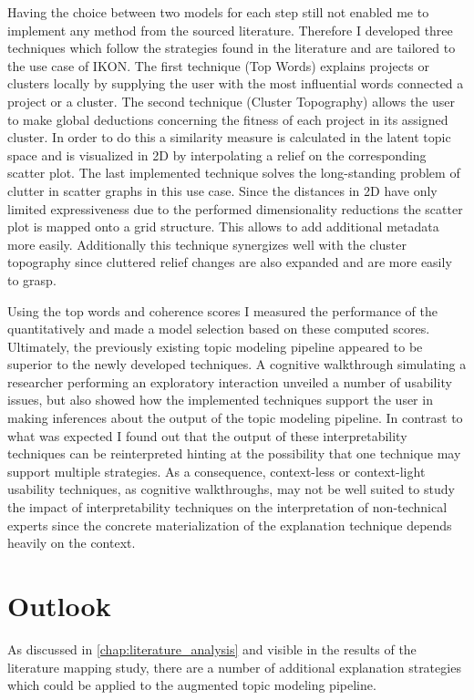 Having the choice between two models for each step still not enabled me to implement any method from the sourced literature. Therefore I developed three techniques which follow the strategies found in the literature and are tailored to the use case of IKON. 
The first technique (Top Words) explains projects or clusters locally by supplying the user with the most influential words connected a project or a cluster.
The second technique (Cluster Topography) allows the user to make global deductions concerning the fitness of each project in its assigned cluster. In order to do this a similarity measure is calculated in the latent topic space and is visualized in 2D by interpolating a relief on the corresponding scatter plot.
The last implemented technique solves the long-standing problem of clutter in scatter graphs in this use case. Since the distances in 2D have only limited expressiveness due to the performed dimensionality reductions the scatter plot is mapped onto a grid structure. This allows to add additional metadata more easily. Additionally this technique synergizes well with the cluster topography since cluttered relief changes are also expanded and are more easily to grasp.

Using the top words and coherence scores I measured the performance of the  quantitatively and made a model selection based on these computed scores. Ultimately, the previously existing topic modeling pipeline appeared to be superior to the newly developed techniques.
A cognitive walkthrough simulating a researcher performing an exploratory interaction unveiled a number of usability issues, but also showed how the implemented techniques support the user in making inferences about the output of the topic modeling pipeline.  In contrast to what was expected I found out that the output of these interpretability techniques can be reinterpreted hinting at the possibility that one technique may support multiple strategies. As a consequence, context-less or context-light usability techniques, as cognitive walkthroughs, may not be well suited to study the impact of interpretability techniques on the interpretation of non-technical experts since the concrete materialization of the explanation technique depends heavily on the context.

\section{Outlook}   
As discussed in \autoref{chap:literature_analysis} and visible in the results of the literature mapping study, there are a number of additional explanation strategies which could be applied to the augmented topic modeling pipeline.

